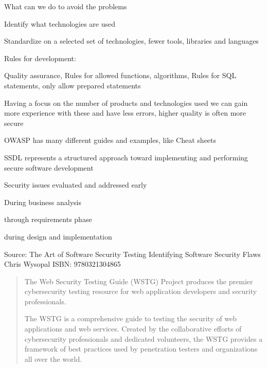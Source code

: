 \documentclass[Screen16to9,17pt]{foils}
\begin{document}

\begin{list1}
\item What can we do to avoid the problems
\item Identify what technologies are used
\item Standardize on a selected set of technologies, fewer tools, libraries and languages
\item Rules for development:
\begin{list2}
\item Quality assurance, Rules for allowed functions, algorithms, Rules for SQL statements, only allow prepared statements
\end{list2}
\item Having a focus on the number of products and technologies used we can gain more experience with these and have less errors, higher quality is often more secure
\item OWASP has many different guides and examples, like Cheat sheets\\
\end{list1}



\begin{list2}
\item SSDL represents a structured approach toward implementing and performing secure software development
\item Security issues evaluated and addressed early
\item During business analysis
\item through requirements phase
\item during design and implementation
\end{list2}

Source: The Art of Software Security Testing Identifying Software Security Flaws
Chris Wysopal ISBN: 9780321304865


\begin{quote}
The Web Security Testing Guide (WSTG) Project produces the premier cybersecurity
testing resource for web application developers and security professionals.

The WSTG is a comprehensive guide to testing the security of web applications and
web services. Created by the collaborative efforts of cybersecurity professionals
and dedicated volunteers, the WSTG provides a framework of best practices used by
penetration testers and organizations all over the world.
\end{quote}
\end{document}
